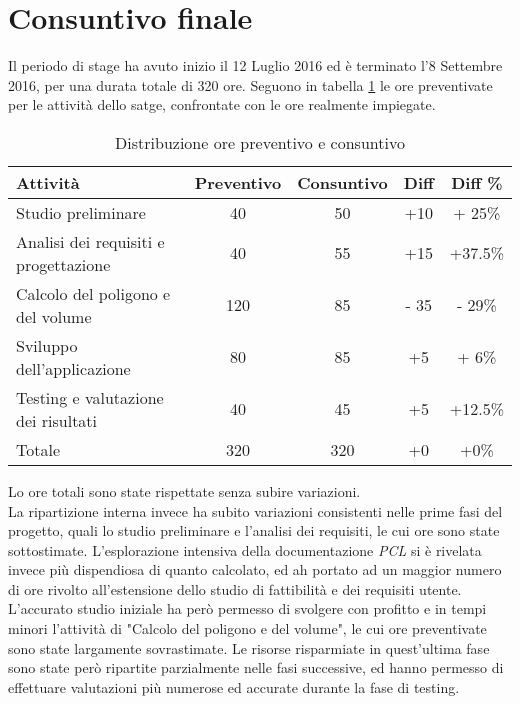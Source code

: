 \section{Consuntivo finale}
Il periodo di stage ha avuto inizio il 12 Luglio 2016 ed è terminato l'8 Settembre 2016, per una durata totale di 320 ore.
Seguono in tabella \ref{tab:preventivo-consuntivo} le ore preventivate per le attività dello satge, confrontate con le ore realmente impiegate.
\begin{table}[h]
	\begin{center}
	  \begin{tabular}{| l | c | c | c | c |}
	    \hline
	    \textbf{Attività} & \textbf{Preventivo} & \textbf{Consuntivo} & \textbf{Diff} & \textbf{Diff \%} \\ \hline
	    Studio preliminare & 40 & 50 & +10 & + 25\%\\
	    \hline
	    Analisi dei requisiti e progettazione & 40 & 55 & +15 & +37.5\%\\
	    \hline
	    Calcolo del poligono e del volume & 120 & 85 & - 35 & - 29\%\\
	    \hline
	    Sviluppo dell'applicazione & 80 & 85 & +5 &  + 6\%\\
	    \hline
	    Testing e valutazione dei risultati & 40 & 45 & +5 & +12.5\%\\
	    \hline

	    Totale & 320 & 320 & +0 & +0\%\\
	    \hline
	  \end{tabular}
	\end{center}
	\caption{Distribuzione ore preventivo e consuntivo}
	\label{tab:preventivo-consuntivo}
\end{table}
\newline
Lo ore totali sono state rispettate senza subire variazioni.\\
La ripartizione interna invece ha subito variazioni consistenti nelle prime fasi del progetto, quali lo studio preliminare e l'analisi dei requisiti, le cui ore sono state sottostimate. L'esplorazione intensiva della documentazione \emph{PCL} si è rivelata invece più dispendiosa di quanto calcolato, ed ah portato ad un maggior numero di ore rivolto all'estensione dello studio di fattibilità e dei requisiti utente.\\
 L'accurato studio iniziale ha però permesso di svolgere con profitto e in tempi minori l'attività di "Calcolo del poligono e del volume", le cui ore preventivate sono state largamente sovrastimate. Le risorse risparmiate in quest'ultima fase sono state però ripartite parzialmente nelle fasi successive, ed hanno permesso di effettuare valutazioni più numerose ed accurate durante la fase di testing.



